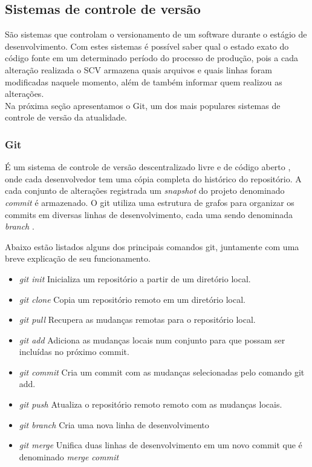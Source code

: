 \documentclass[a4paper,12pt]{article}
\begin{document}
\subsection{Sistemas de controle de versão}%
\label{sec:scv}
São sistemas que controlam o versionamento de um software durante o estágio de desenvolvimento. Com estes sistemas é possível saber qual o estado exato do código fonte em um determinado período do processo de produção, pois a cada alteração realizada o SCV armazena quais arquivos e quais linhas foram modificadas naquele momento, além de também informar quem realizou as alterações.\\

Na próxima seção apresentamos o Git, um dos mais populares sistemas de controle de versão da atualidade.

\subsubsection{Git}%
É um sistema de controle de versão descentralizado livre e de código aberto \cite{git}, onde cada desenvolvedor tem uma cópia completa do histórico do repositório. A cada conjunto de  alterações registrada  um \textit{snapshot} do projeto denominado \textit{commit} é armazenado. O git utiliza uma estrutura de grafos para organizar os commits em diversas linhas de desenvolvimento, cada uma sendo denominada \textit{branch} \cite{gitHandbook}.

Abaixo estão listados alguns dos principais comandos git, juntamente com uma breve explicação de seu funcionamento.

\begin{itemize}
\item{\textit{git init} } Inicializa um repositório a partir de um diretório local.
\item{\textit{git clone} } Copia um repositório remoto em um diretório local.
\item{\textit{git pull} } Recupera as mudanças remotas para o repositório local.
\item{\textit{git add} } Adiciona as mudanças locais num conjunto para que possam ser incluídas no próximo commit.
\item{\textit{git commit} } Cria um commit com as mudanças selecionadas pelo comando git add.
\item{\textit{git push} } Atualiza o repositório remoto remoto com as mudanças locais.
\item{\textit{git branch} } Cria uma nova linha de desenvolvimento
\item{\textit{git merge} } Unifica duas linhas de desenvolvimento em um novo commit que é denominado \textit{merge commit}
\end{itemize}
\end{document}
